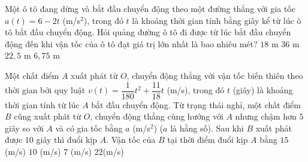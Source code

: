 \begin{ex}%
Một ô tô đang dừng và bắt đầu chuyển động theo một đường thẳng với gia tốc $a\left(t\right)= 6-2t$ (m/s$^2$), trong đó $t$ là khoảng thời gian tính bằng giây kể từ lúc ô tô bắt đầu chuyển động. Hỏi quảng đường ô tô đi được từ lúc bắt đầu chuyển động đến khi vận tốc của ô tô đạt giá trị lớn nhất là bao nhiêu mét?
\choice
	{\True $18$ m}
	{$36$ m}
	{$22{,}5$ m}
	{$6{,}75$ m}
\end{ex}

\begin{ex}%
Một chất điểm $A$ xuất phát từ $O$, chuyển động thẳng với vận tốc biến thiên theo thời gian bởi quy luật $v \left(t\right) = \dfrac{1}{180}t^2 + \dfrac{11}{18}t$ (m/s), trong đó $t$ (giây) là khoảng thời gian tính từ lúc $A$ bắt đầu chuyển động. Từ trạng thái nghỉ, một chất điểm $B$ cũng xuất phát từ $O$, chuyển động thẳng cùng hướng với $A$ nhưng chậm hơn $5$ giây so với $A$ và có gia tốc bằng $a$ (m/s$^2$) ($a$ là hằng số). Sau khi $B$ xuất phát được $10$ giây thì đuổi kịp $A$. Vận tốc của $B$ tại thời điểm đuổi kịp $A$ bằng
\choice
	{\True $15$ (m/s)}
	{$10$ (m/s)}
	{$7$ (m/s)}
	{$22$(m/s)}
\end{ex}

